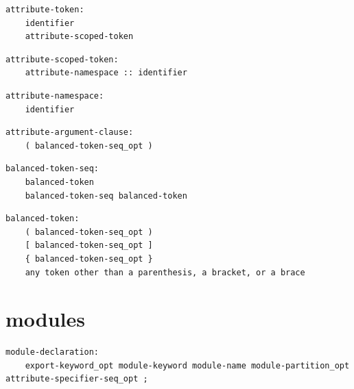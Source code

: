 \noindent\textbf{\texttt{}}\par
\begin{lstlisting}
attribute-token:
    identifier
    attribute-scoped-token
\end{lstlisting}

\noindent\textbf{\texttt{}}\par
\begin{lstlisting}
attribute-scoped-token:
    attribute-namespace :: identifier
\end{lstlisting}

\noindent\textbf{\texttt{}}\par
\begin{lstlisting}
attribute-namespace:
    identifier
\end{lstlisting}

\noindent\textbf{\texttt{}}\par
\begin{lstlisting}
attribute-argument-clause:
    ( balanced-token-seq_opt )
\end{lstlisting}

\noindent\textbf{\texttt{}}\par
\begin{lstlisting}
balanced-token-seq:
    balanced-token
    balanced-token-seq balanced-token
\end{lstlisting}

\noindent\textbf{\texttt{}}\par
\begin{lstlisting}
balanced-token:
    ( balanced-token-seq_opt )
    [ balanced-token-seq_opt ]
    { balanced-token-seq_opt }
    any token other than a parenthesis, a bracket, or a brace
\end{lstlisting}

\section{modules}

\noindent\textbf{\texttt{}}\par
\begin{lstlisting}
module-declaration:
    export-keyword_opt module-keyword module-name module-partition_opt attribute-specifier-seq_opt ;
\end{lstlisting}

